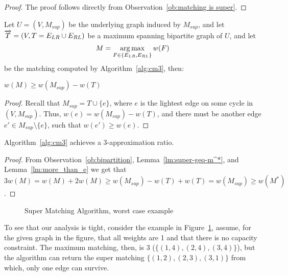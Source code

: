 \begin{proof}
The proof follows directly from Observation~\ref{ob:matching is super}. 
\end{proof}
%
Let $U = (V, M_{sup})$ be the underlying graph induced by $M_{sup}$, 
and let $\overrightarrow{T} = (V, T = E_{LR} \cup E_{RL})$ be a maximum spanning bipartite graph of $U$,
and let 
$$M = \operatorname*{arg\,max}_{F \in \{ E_{LR}, E_{RL} \}}{w(F)}$$
be the matching computed by Algorithm~\ref{alg:cm3}, then:

\begin{lemma}
\label{lm:more_than_e}
$w(M) \geq w(M_{sup}) - w(T)$
\end{lemma}

\begin{proof}
Recall that $M_{sup} = T \cup \{e\}$, 
where $e$ is the lightest edge on some cycle in $(V, M_{sup})$. 
Thus, $w(e) = w(M_{sup}) - w(T)$, 
and there must be another edge $e' \in M_{sup} \setminus \{e\}$, 
such that $w(e') \geq w(e)$.
\end{proof}

\begin{theorem}
Algorithm~\ref{alg:cm3} achieves a 3-approximation ratio.
\end{theorem}

\begin{proof}
From Observation~\ref{ob:bipartition}, Lemma~\ref{lm:super-geq-m^*},
and Lemma~\ref{lm:more_than_e} we get that
$$3w(M) = w(M) + 2w(M) \geq w(M_{sup}) - w(T) + w(T) = w(M_{sup}) \geq w(M^*)$$.
\end{proof}

\begin{figure}
\centering

\caption{
\label{fig:3cm-tight-fig}
Super Matching Algorithm, worst case example
}
\end{figure}

To see that our analysis is tight, consider the example in Figure~\ref{fig:3cm-tight-fig},
assume, for the given graph in the figure, 
that all weights are 1 and that there is no capacity constraint.
The maximum matching, then, is 3 ($\{(1,4), (2,4), (3,4)\}$), 
but the algorithm can return the super matching $\{(1,2), (2,3), (3,1)\}$ from which, 
only one edge can survive.  